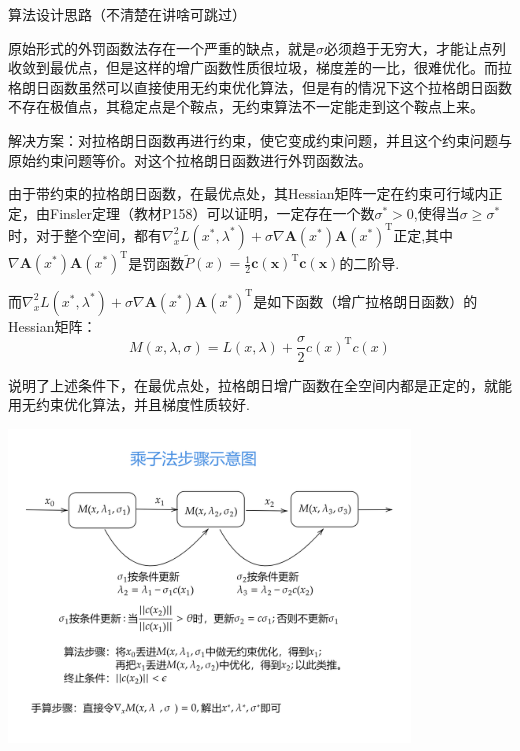 \documentclass[cn]{elegantbook}
\begin{document}
\begin{note}
\begin{center}
  \textcolor[rgb]{0.00,0.00,1.00}{\Large 算法设计思路（不清楚在讲啥可跳过）}
\end{center}

原始形式的外罚函数法存在一个严重的缺点，就是$\sigma$必须趋于无穷大，才能让点列收敛到最优点，但是这样的增广函数性质很垃圾，梯度差的一比，很难优化。而拉格朗日函数虽然可以直接使用无约束优化算法，但是有的情况下这个拉格朗日函数不存在极值点，其稳定点是个鞍点，无约束算法不一定能走到这个鞍点上来。

解决方案：对拉格朗日函数再进行约束，使它变成约束问题，并且这个约束问题与原始约束问题等价。对这个拉格朗日函数进行外罚函数法。

由于带约束的拉格朗日函数，在最优点处，其Hessian矩阵一定在约束可行域内正定，由Finsler定理（教材P158）可以证明，一定存在一个数$\sigma^*>0$,使得当$\sigma\geq\sigma^*$时，对于整个空间，都有$\nabla_{x}^{2} L\left(x^{*}, \lambda^{*}\right)+\sigma \nabla \boldsymbol{A}\left(x^{*}\right) \boldsymbol{A}\left(x^{*}\right)^{\mathrm{T}}$正定,其中$ \nabla \boldsymbol{A}\left(x^{*}\right) \boldsymbol{A}\left(x^{*}\right)^{\mathrm{T}}$是罚函数$ \tilde{P}(x)=\frac{1}{2} \boldsymbol{c}(\boldsymbol{x})^{\mathrm{T}} \boldsymbol{c}(\boldsymbol{x})$的二阶导.

而$\nabla_{x}^{2} L\left(x^{*}, \lambda^{*}\right)+\sigma \nabla \boldsymbol{A}\left(x^{*}\right) \boldsymbol{A}\left(x^{*}\right)^{\mathrm{T}}$是如下函数（增广拉格朗日函数）的Hessian矩阵：
$$M(x, \lambda, \sigma)=L(x, \lambda)+\frac{\sigma}{2} c(x)^{\mathrm{T}} c(x)$$

说明了上述条件下，在最优点处，拉格朗日增广函数在全空间内都是正定的，就能用无约束优化算法，并且梯度性质较好.

\centerline{\includegraphics[width=0.8\textwidth]{fig4}}
\end{note}
\end{document}
